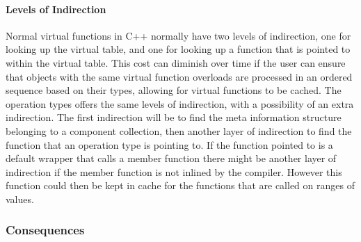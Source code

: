 \paragraph{Levels of Indirection}
Normal virtual functions in C++ normally have two levels of indirection, one for looking up the virtual table,
and one for looking up a function that is pointed to within the virtual table.
This cost can diminish over time if the user can ensure that objects with the same virtual function overloads
are processed in an ordered sequence based on their types, allowing for virtual functions to be cached.
The operation types offers the same levels of indirection, with a possibility of an extra indirection.
The first indirection will be to find the meta information structure belonging to a component collection,
then another layer of indirection to find the function that an operation type is pointing to.
If the function pointed to is a default wrapper that calls a member function there might be another layer of indirection
if the member function is not inlined by the compiler.
However this function could then be kept in cache for the functions that are called on ranges of values.

\subsubsection{Consequences}
